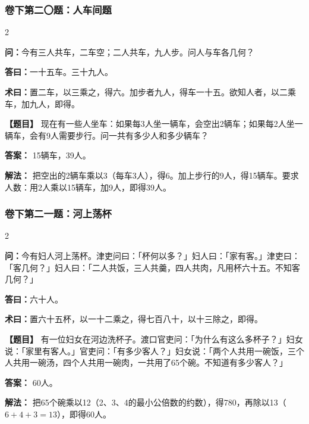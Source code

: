 \documentclass[11pt,a4paper]{article}
\begin{document}
\vspace{0.3cm}

\subsubsection*{卷下第二〇题：人车间题}
\begin{paracol}{2}
\begin{problemclassical}
\textbf{问：}今有三人共车，二车空；二人共车，九人步。问人与车各几何？

\textbf{答曰：}一十五车。三十九人。

\textbf{术曰：}置二车，以三乘之，得六。加步者九人，得车一十五。欲知人者，以二乘车，加九人，即得。
\end{problemclassical}
\switchcolumn
\begin{problemmodern}
\textbf{【题目】} 现在有一些人坐车：如果每3人坐一辆车，会空出2辆车；如果每2人坐一辆车，会有9人需要步行。问一共有多少人和多少辆车？

\textbf{答案：} 15辆车，39人。

\textbf{解法：} 把空出的2辆车乘以3（每车3人），得6。加上步行的9人，得15辆车。要求人数：用2人乘以15辆车，加9人，即得39人。
\end{problemmodern}
\end{paracol}

\vspace{0.3cm}

\subsubsection*{卷下第二一题：河上荡杯}
\begin{paracol}{2}
\begin{problemclassical}
\textbf{问：}今有妇人河上荡杯。津吏问曰：「杯何以多？」妇人曰：「家有客。」津吏曰：「客几何？」妇人曰：「二人共饭，三人共羹，四人共肉，凡用杯六十五。不知客几何？」

\textbf{答曰：}六十人。

\textbf{术曰：}置六十五杯，以一十二乘之，得七百八十，以十三除之，即得。
\end{problemclassical}
\switchcolumn
\begin{problemmodern}
\textbf{【题目】} 有一位妇女在河边洗杯子。渡口官吏问：「为什么有这么多杯子？」妇女说：「家里有客人。」官吏问：「有多少客人？」妇女说：「两个人共用一碗饭，三个人共用一碗汤，四个人共用一碗肉，一共用了65个碗。不知道有多少客人？」

\textbf{答案：} 60人。

\textbf{解法：} 把65个碗乘以12（2、3、4的最小公倍数的约数），得780，再除以13（$6+4+3=13$），即得60人。
\end{problemmodern}
\end{paracol}
\end{document}
